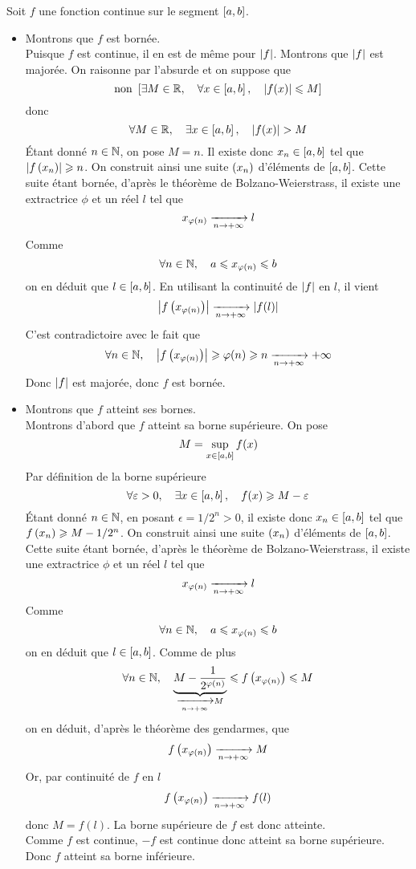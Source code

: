 \documentclass{magnolia}
\begin{document}
\begin{preuve}
Soit $f$ une fonction continue sur le segment $\left[a,b\right]$.
\begin{itemize}
\item Montrons que $f$ est bornée.\\
  Puisque $f$ est continue, il en est de même pour $\left|f\right|$. Montrons que
  $\left|f\right|$ est majorée. On raisonne par l'absurde et on suppose que
  \[{\rm non}\ \left[\exists M\in\mathbb{R} ,\quad \forall x\in\left[a,b\right] ,\quad
           \left|f(x)\right|\leqslant M\right]\]
   donc
  \[\forall M\in\R \qsep \exists x\in\interf{a}{b} \qsep \abs{f(x)}>M\]
   Étant donné $n\in\mathbb{N}$, on pose $M=n$. Il existe donc $x_n\in\left[a,b\right]$
   tel que $\left|f\left(x_n\right)\right|\geqslant n$. On construit ainsi une suite
   $\left(x_n\right)$ d'éléments de $\left[a,b\right]$. Cette suite étant bornée, d'après
   le théorème de Bolzano-Weierstrass, il existe une extractrice $\phi$ et un
   réel $l$ tel que
   \[x_{\varphi(n)}\xrightarrow[n\rightarrow +\infty]{} l\]
   Comme
   \[\forall n\in\mathbb{N} ,\quad a\leqslant x_{\varphi(n)}\leqslant b\]
   on en déduit que $l\in\left[a,b\right]$. En utilisant la continuité de
   $\left|f\right|$ en $l$, il vient
   \[\left|f\left(x_{\varphi(n)}\right)\right|\xrightarrow[n\rightarrow +\infty]{} \left|f(l)\right|\]
   C'est contradictoire avec le fait que
   \[\forall n\in\mathbb{N} ,\quad \left|f\left(x_{\varphi(n)}\right)\right|\geqslant \varphi(n)\geqslant n
     \xrightarrow[n\rightarrow +\infty]{} +\infty\]
   Donc $\left|f\right|$ est majorée, donc $f$ est bornée.
\item Montrons que $f$ atteint ses bornes.\\
   Montrons d'abord que $f$ atteint sa borne supérieure. On pose
   \[M=\sup_{x\in\left[a,b\right]} f(x)\]
   Par définition de la borne supérieure
   \[\forall \varepsilon>0 ,\quad \exists x\in\left[a,b\right] ,\quad
     f(x)\geqslant M-\varepsilon\]
   Étant donné $n\in\mathbb{N}$, en posant $\epsilon=1/2^n>0$, il existe donc
   $x_n\in\left[a,b\right]$ tel que $f\left(x_n\right)\geqslant M-1/2^n$. 
   On construit ainsi une suite $\left(x_n\right)$ d'éléments de $\left[a,b\right]$. Cette
   suite étant bornée, d'après le théorème de Bolzano-Weierstrass, il existe
   une extractrice $\phi$ et un réel $l$ tel que
   \[x_{\varphi(n)}\xrightarrow[n\rightarrow +\infty]{} l\]
   Comme
   \[\forall n\in\mathbb{N} ,\quad a\leqslant x_{\varphi(n)}\leqslant b\]
   on en déduit que $l\in\left[a,b\right]$. Comme de plus
   \[\forall n\in\mathbb{N} ,\quad
     \underbrace{M-\frac{1}{2^{\varphi(n)}}}_{\xrightarrow[n\rightarrow +\infty]{} M}
     \leqslant f\left(x_{\varphi(n)}\right)\leqslant M\]
   on en déduit, d'après le théorème des gendarmes, que
   \[f\left(x_{\varphi(n)}\right)\xrightarrow[n\rightarrow +\infty]{} M\]
   Or, par continuité de $f$ en $l$
   \[f\left(x_{\varphi(n)}\right)\xrightarrow[n\rightarrow +\infty]{} f(l)\]
   donc $M=f(l)$. La borne supérieure de $f$ est donc atteinte.\\
   Comme $f$ est
   continue, $-f$ est continue donc atteint sa borne supérieure. Donc $f$
   atteint sa borne inférieure.
\end{itemize}
\end{preuve}
\end{document}
